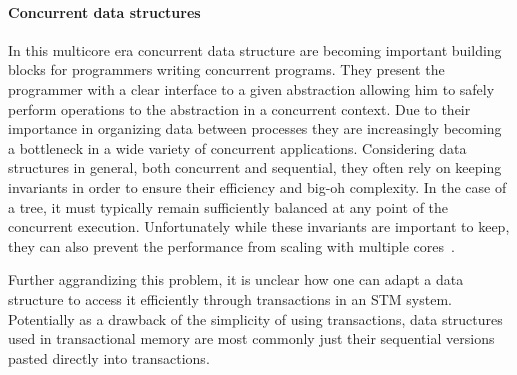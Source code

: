 \paragraph{Concurrent data structures}
In this multicore era concurrent data structure are becoming important building blocks
for programmers writing concurrent programs.
They present the programmer with a clear interface to a given abstraction allowing
him to safely perform operations to the abstraction in a concurrent context.
Due to their importance in organizing data between processes they are increasingly becoming a bottleneck
in a wide variety of concurrent applications.
Considering data structures in general, both concurrent and sequential, they often rely on keeping invariants
in order to ensure their efficiency and big-oh complexity.
In the case of a tree, it must typically remain sufficiently balanced at any point of the concurrent execution.
Unfortunately while these invariants are important to keep, they can also prevent
the performance from scaling with multiple cores~\cite{Sha2011}.


Further aggrandizing this problem, it is unclear how one can adapt a data structure to 
access it efficiently through transactions in an STM system.
Potentially as a drawback of the simplicity of using transactions, 
data structures used in transactional memory are most commonly just
their sequential versions pasted directly into transactions.

